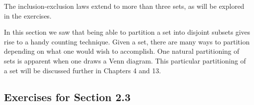 \documentclass[10pt,]{book}
\theoremstyle{plain}
\theoremstyle{definition}
\begin{document}
%
\par
The inclusion-exclusion laws extend to more than three sets, as will be explored in the exercises.%
\par

 In this section we saw that being able to partition a set into disjoint subsets gives rise to a handy counting technique. Given a set, there are many ways to partition depending on what one would wish to accomplish. One natural partitioning of sets is apparent when one draws a Venn diagram. This particular partitioning of a set will be discussed further in Chapters 4 and 13.
%
\typeout{************************************************}
\typeout{************************************************}
\subsection[Exercises for Section 2.3]{Exercises for Section 2.3}\label{exercises-2-3}
\end{document}
